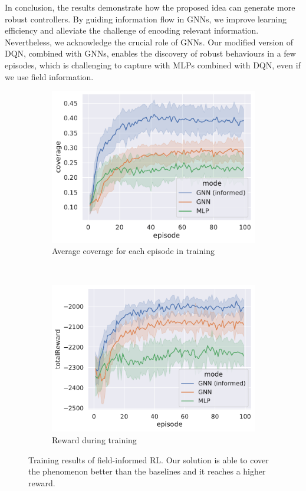 \documentclass[conference]{IEEEtran}
\begin{document}
In conclusion, the results demonstrate how the proposed idea can generate more robust controllers. 
 By guiding information flow in \acp{GNN}, 
 we improve learning efficiency and alleviate the challenge of encoding relevant information. 
%
Nevertheless, we acknowledge the crucial role of \acp{GNN}. 
 Our modified version of DQN, combined with \acp{GNN}, 
 enables the discovery of robust behaviours in a few episodes, 
 which is challenging to capture with \acp{MLP} combined with \ac{DQN}, even if we use field information.
\begin{figure}
  \centering
  \hfill
  \begin{subfigure}[b]{0.87 \linewidth}
    \includegraphics[width=\linewidth]{imgs/coverage-in-time}
    \caption{Average coverage for each episode in training }
    \label{fig:coverage}
  \end{subfigure}\\
  \hfill
  \begin{subfigure}[b]{0.9\linewidth}
    \includegraphics[width=\linewidth]{imgs/reward-in-time}
    \caption{Reward during training}
    \label{fig:reward}
  \end{subfigure}
  \caption{Training results of field-informed \ac{RL}. 
  Our solution is able to cover the phenomenon better than the baselines and it reaches a higher reward. 
  }
  \label{fig:training}
\end{figure}
\end{document}
